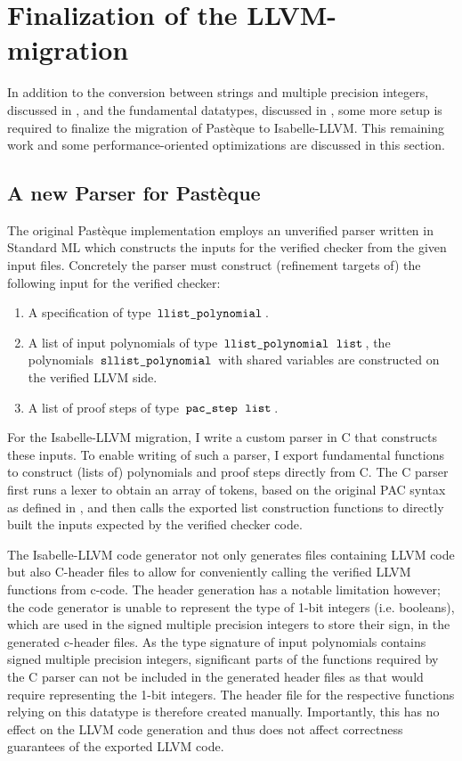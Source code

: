 \section{Finalization of the LLVM-migration}\label{sec:finalization-of-llvm-migration}
In addition to the conversion between strings and multiple precision integers, discussed in , and the fundamental datatypes, discussed in , some more setup is required to finalize the migration of Pastèque to Isabelle-LLVM.
This remaining work and some performance-oriented optimizations are discussed in this section.

\subsection{A new Parser for Pastèque}\label{sec:pasteque-parser-c}
The original Pastèque implementation employs an unverified parser written in Standard ML which constructs the inputs for the verified checker from the given input files.
Concretely the parser must construct (refinement targets of) the following input for the verified checker:
\begin{enumerate}
	\item A specification of type $\,\text{\ttfamily llist\_polynomial}\,$.
	\item A list of input polynomials of type $\,\text{\ttfamily llist\_polynomial}\, \; \,\text{\ttfamily list}\,$, the polynomials $\,\text{\ttfamily sllist\_polynomial}\,$ with shared variables are constructed on the verified LLVM side.
	\item A list of proof steps of type $\,\text{\ttfamily pac\_step}\, \; \,\text{\ttfamily list}\,$.
\end{enumerate}
For the Isabelle-LLVM migration, I write a custom parser in C that constructs these inputs.
To enable writing of such a parser, I export fundamental functions to construct (lists of) polynomials and proof steps directly from C.
The C parser first runs a lexer to obtain an array of tokens, based on the original PAC syntax as defined in \cite{pac-2024}, and then calls the exported list construction functions to directly built the inputs expected by the verified checker code.

The Isabelle-LLVM code generator not only generates  files containing LLVM code but also C-header files to allow for conveniently calling the verified LLVM functions from c-code.
The header generation has a notable limitation however; the code generator is unable to represent the type of 1-bit integers (i.e. booleans), which are used in the signed multiple precision integers to store their sign, in the generated c-header files.
As the type signature of input polynomials contains signed multiple precision integers, significant parts of the functions required by the C parser can not be included in the generated header files as that would require representing the 1-bit integers.
The header file for the respective functions relying on this datatype is therefore created manually.
Importantly, this has no effect on the LLVM code generation and thus does not affect correctness guarantees of the exported LLVM code.

